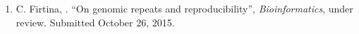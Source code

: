 
\begin{enumerate}
\item 
C. Firtina, \calkan{}. ``On genomic repeats and reproducibility'',
{\em Bioinformatics}, under review. Submitted October 26, 2015.
\end{enumerate}
